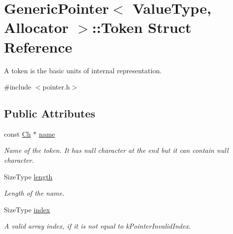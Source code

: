 \hypertarget{structGenericPointer_1_1Token}{}\section{Generic\+Pointer$<$ Value\+Type, Allocator $>$\+:\+:Token Struct Reference}
\label{structGenericPointer_1_1Token}


A token is the basic units of internal representation.  




{\ttfamily \#include $<$pointer.\+h$>$}

\subsection*{Public Attributes}
\begin{DoxyCompactItemize}
\item 
\mbox{\label{structGenericPointer_1_1Token_a8aa9b13bd66addb0c0512cfcae72174c}} 
const \hyperlink{classGenericPointer_ab292356c11b4015c98d21b966b11f285}{Ch} $\ast$ \hyperlink{structGenericPointer_1_1Token_a8aa9b13bd66addb0c0512cfcae72174c}{name}
\begin{DoxyCompactList}\small\item\em Name of the token. It has null character at the end but it can contain null character. \end{DoxyCompactList}\item 
\mbox{\label{structGenericPointer_1_1Token_a67383574032a3289d34002bb2d95df6d}} 
Size\+Type \hyperlink{structGenericPointer_1_1Token_a67383574032a3289d34002bb2d95df6d}{length}
\begin{DoxyCompactList}\small\item\em Length of the name. \end{DoxyCompactList}\item 
\mbox{\label{structGenericPointer_1_1Token_a0ce571cfe3f3da942a5912bb2cd24dcf}} 
Size\+Type \hyperlink{structGenericPointer_1_1Token_a0ce571cfe3f3da942a5912bb2cd24dcf}{index}
\begin{DoxyCompactList}\small\item\em A valid array index, if it is not equal to k\+Pointer\+Invalid\+Index. \end{DoxyCompactList}\end{DoxyCompactItemize}


